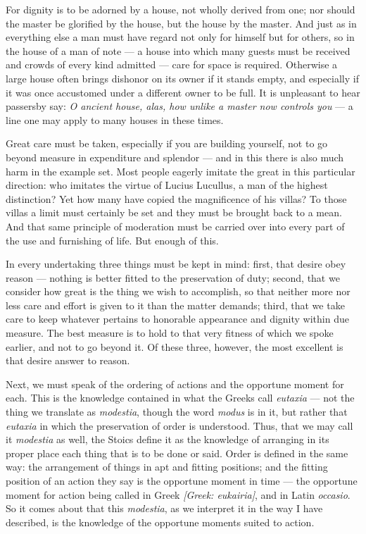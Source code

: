 For dignity is to be adorned by a house, not wholly derived from one; nor should the master be glorified by the house, but the house by the master. And just as in everything else a man must have regard not only for himself but for others, so in the house of a man of note — a house into which many guests must be received and crowds of every kind admitted — care for space is required. Otherwise a large house often brings dishonor on its owner if it stands empty, and especially if it was once accustomed under a different owner to be full. It is unpleasant to hear passersby say: \textit{O ancient house, alas, how unlike a master now controls you} — a line one may apply to many houses in these times.

 Great care must be taken, especially if you are building yourself, not to go beyond measure in expenditure and splendor — and in this there is also much harm in the example set. Most people eagerly imitate the great in this particular direction: who imitates the virtue of Lucius Lucullus, a man of the highest distinction? Yet how many have copied the magnificence of his villas? To those villas a limit must certainly be set and they must be brought back to a mean. And that same principle of moderation must be carried over into every part of the use and furnishing of life. But enough of this.

 In every undertaking three things must be kept in mind: first, that desire obey reason — nothing is better fitted to the preservation of duty; second, that we consider how great is the thing we wish to accomplish, so that neither more nor less care and effort is given to it than the matter demands; third, that we take care to keep whatever pertains to honorable appearance and dignity within due measure. The best measure is to hold to that very fitness of which we spoke earlier, and not to go beyond it. Of these three, however, the most excellent is that desire answer to reason.

 Next, we must speak of the ordering of actions and the opportune moment for each. This is the knowledge contained in what the Greeks call \textit{eutaxia} — not the thing we translate as \textit{modestia}, though the word \textit{modus} is in it, but rather that \textit{eutaxia} in which the preservation of order is understood. Thus, that we may call it \textit{modestia} as well, the Stoics define it as the knowledge of arranging in its proper place each thing that is to be done or said. Order is defined in the same way: the arrangement of things in apt and fitting positions; and the fitting position of an action they say is the opportune moment in time — the opportune moment for action being called in Greek \textit{[Greek: eukairia]}, and in Latin \textit{occasio}. So it comes about that this \textit{modestia}, as we interpret it in the way I have described, is the knowledge of the opportune moments suited to action.

